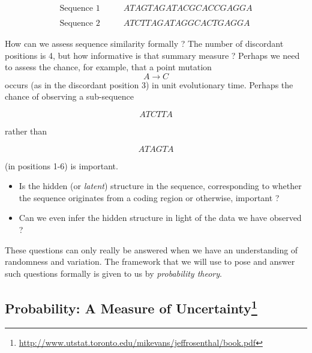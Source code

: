 \documentclass[]{book}
\providecommand{\tightlist}{%
  \setlength{\itemsep}{0pt}\setlength{\parskip}{0pt}}
\let\rmarkdownfootnote\footnote%
\def\footnote{\protect\rmarkdownfootnote}
\providecommand{\tightlist}{%
  \setlength{\itemsep}{0pt}\setlength{\parskip}{0pt}}
\theoremstyle{definition}
\theoremstyle{definition}
\theoremstyle{definition}
\theoremstyle{remark}
\let\BeginKnitrBlock\begin \let\EndKnitrBlock\end
\begin{document}
\BeginKnitrBlock{example}[Two nucleotide sequences]
\protect\hypertarget{exm:unnamed-chunk-14}{}{\label{exm:unnamed-chunk-14}
{} }

\begin{equation*}
\begin{array}{ll}
\text{{Sequence 1}}{\qquad } & ATAGTAGATACGCACCGAGGA \\
&  \\
\text{{Sequence 2}}{\qquad } & ATCTTAGATAGGCACTGAGGA
\end{array}
\end{equation*}

How can we assess sequence similarity formally ? The number of
discordant positions is 4, but how informative is that summary measure ?
Perhaps we need to assess the chance, for example, that a point mutation
\[ A\rightarrow C \] occurs (as in the discordant position 3) in unit
evolutionary time. Perhaps the chance of observing a sub-sequence

\begin{equation*}
ATCTTA
\end{equation*}

rather than

\begin{equation*}
ATAGTA
\end{equation*}

(in positions 1-6) is important.

\begin{itemize}
\tightlist
\item
  Is the hidden (or \emph{latent}) structure in the sequence,
  corresponding to whether the sequence originates from a coding region
  or otherwise, important ?
\item
  Can we even infer the hidden structure in light of the data we have
  observed ?\\
\end{itemize}
\EndKnitrBlock{example}

These questions can only really be answered when we have an
understanding of randomness and variation. The framework that we will
use to pose and answer such questions formally is given to us by
\emph{probability theory}.

\subsection*{\texorpdfstring{Probability: A Measure of
Uncertainty\footnote{\url{http://www.utstat.toronto.edu/mikevans/jeffrosenthal/book.pdf}}}{Probability: A Measure of Uncertainty}}\label{probability-a-measure-of-uncertainty2}
\end{document}
